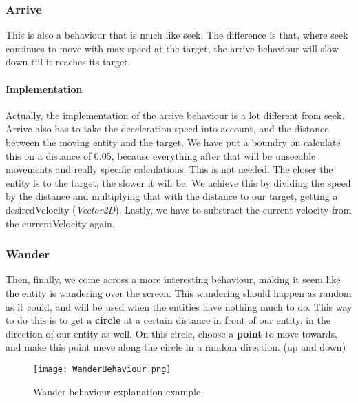 \subsubsection{Arrive}
This is also a behaviour that is much like seek.
The difference is that, where seek continues to move with max speed at the target, the arrive behaviour will slow down till it reaches its target.
\paragraph{Implementation}
Actually, the implementation of the arrive behaviour is a lot different from seek.
Arrive also has to take the deceleration speed into account, and the distance between the moving entity and the target.
We have put a boundry on calculate this on a distance of 0.05, because everything after that will be unseeable movements and really specific calculations.
This is not needed.
The closer the entity is to the target, the slower it will be.
We achieve this by dividing the speed by the distance and multiplying that with the distance to our target, getting a desiredVelocity (\textit{Vector2D}).
Lastly, we have to substract the current velocity from the currentVelocity again.
\subsubsection{Wander}
Then, finally, we come across a more interesting behaviour, making it seem like the entity is wandering over the screen.
This wandering should happen as random as it could, and will be used when the entities have nothing much to do.
This way to do this is to get a \textbf{circle} at a certain distance in front of our entity, in the direction of our entity as well.
On this circle, choose a \textbf{point} to move towards, and make this point move along the circle in a random direction. (up and down)
\begin{figure}[h!]
    \begin{center}
        \texttt{[image: WanderBehaviour.png]}
    \end{center}
    \caption{Wander behaviour explanation example}
    \label{fig:WanderBehaviourExplanation}
\end{figure}
